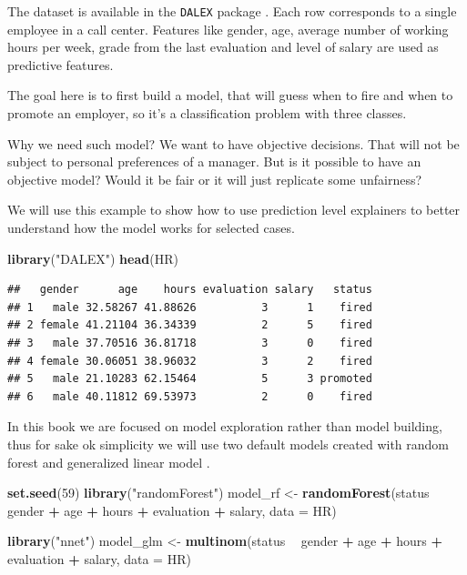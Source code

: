 \documentclass[]{krantz}
\newenvironment{Shaded}{\begin{snugshade}}{\end{snugshade}}
\newcommand{\DataTypeTok}[1]{\textcolor[rgb]{0.13,0.29,0.53}{#1}}
\newcommand{\DecValTok}[1]{\textcolor[rgb]{0.00,0.00,0.81}{#1}}
\newcommand{\KeywordTok}[1]{\textcolor[rgb]{0.13,0.29,0.53}{\textbf{#1}}}
\newcommand{\NormalTok}[1]{#1}
\newcommand{\OperatorTok}[1]{\textcolor[rgb]{0.81,0.36,0.00}{\textbf{#1}}}
\newcommand{\StringTok}[1]{\textcolor[rgb]{0.31,0.60,0.02}{#1}}
\theoremstyle{definition}
\theoremstyle{definition}
\theoremstyle{definition}
\theoremstyle{remark}
\begin{document}
The dataset is available in the \texttt{DALEX} package \citep{R-DALEX}.
Each row corresponds to a single employee in a call center. Features
like gender, age, average number of working hours per week, grade from
the last evaluation and level of salary are used as predictive features.

The goal here is to first build a model, that will guess when to fire
and when to promote an employer, so it's a classification problem with
three classes.

Why we need such model? We want to have objective decisions. That will
not be subject to personal preferences of a manager. But is it possible
to have an objective model? Would it be fair or it will just replicate
some unfairness?

We will use this example to show how to use prediction level explainers
to better understand how the model works for selected cases.

\begin{Shaded}
\begin{Highlighting}[]
\KeywordTok{library}\NormalTok{(}\StringTok{"DALEX"}\NormalTok{)}
\KeywordTok{head}\NormalTok{(HR)}
\end{Highlighting}
\end{Shaded}

\begin{verbatim}
##   gender      age    hours evaluation salary   status
## 1   male 32.58267 41.88626          3      1    fired
## 2 female 41.21104 36.34339          2      5    fired
## 3   male 37.70516 36.81718          3      0    fired
## 4 female 30.06051 38.96032          3      2    fired
## 5   male 21.10283 62.15464          5      3 promoted
## 6   male 40.11812 69.53973          2      0    fired
\end{verbatim}

In this book we are focused on model exploration rather than model
building, thus for sake ok simplicity we will use two default models
created with random forest \citep{R-randomForest} and generalized linear
model \citep{R-nnet}.

\begin{Shaded}
\begin{Highlighting}[]
\KeywordTok{set.seed}\NormalTok{(}\DecValTok{59}\NormalTok{)}
\KeywordTok{library}\NormalTok{(}\StringTok{"randomForest"}\NormalTok{)}
\NormalTok{model_rf <-}\StringTok{ }\KeywordTok{randomForest}\NormalTok{(status }\OperatorTok{~}\StringTok{ }\NormalTok{gender }\OperatorTok{+}\StringTok{ }\NormalTok{age }\OperatorTok{+}\StringTok{ }\NormalTok{hours }\OperatorTok{+}\StringTok{ }\NormalTok{evaluation }\OperatorTok{+}\StringTok{ }\NormalTok{salary, }\DataTypeTok{data =}\NormalTok{ HR)}

\KeywordTok{library}\NormalTok{(}\StringTok{"nnet"}\NormalTok{)}
\NormalTok{model_glm <-}\StringTok{ }\KeywordTok{multinom}\NormalTok{(status }\OperatorTok{~}\StringTok{ }\NormalTok{gender }\OperatorTok{+}\StringTok{ }\NormalTok{age }\OperatorTok{+}\StringTok{ }\NormalTok{hours }\OperatorTok{+}\StringTok{ }\NormalTok{evaluation }\OperatorTok{+}\StringTok{ }\NormalTok{salary, }\DataTypeTok{data =}\NormalTok{ HR)}
\end{Highlighting}
\end{Shaded}
\end{document}
